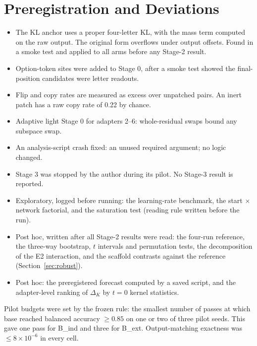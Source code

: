 \documentclass[11pt]{article}
\begin{document}
\appendix
\section{Preregistration and Deviations}\label{app:prereg}
\begin{itemize}
\item[D1] The KL anchor uses a proper four-letter KL, with the mass term computed on the raw output. The original form overflows under output offsets. Found in a smoke test and applied to all arms before any Stage-2 result.
\item[D2] Option-token sites were added to Stage 0, after a smoke test showed the final-position candidates were letter readouts.
\item[D3] Flip and copy rates are measured as excess over unpatched pairs. An inert patch has a raw copy rate of 0.22 by chance.
\item[D4] Adaptive light Stage 0 for adapters 2--6: whole-residual swaps bound any subspace swap.
\item[D5] An analysis-script crash fixed: an unused required argument; no logic changed.
\item[D6] Stage 3 was stopped by the author during its pilot. No Stage-3 result is reported.
\item[E1, E2] Exploratory, logged before running: the learning-rate benchmark, the start $\times$ network factorial, and the saturation test (reading rule written before the run).
\item[E3] Post hoc, written after all Stage-2 results were read: the four-run reference, the three-way bootstrap, $t$ intervals and permutation tests, the decomposition of the E2 interaction, and the scaffold contrasts against the reference (Section~\ref{sec:robust}).
\item[E4] Post hoc: the preregistered forecast computed by a saved script, and the adapter-level ranking of $\Delta_K$ by $t=0$ kernel statistics.
\end{itemize}
Pilot budgets were set by the frozen rule: the smallest number of passes at which base reached balanced accuracy $\ge0.85$ on one or two of three pilot seeds. This gave one pass for B\_ind and three for B\_ext. Output-matching exactness was $\le 8\times10^{-6}$ in every cell.
\end{document}
